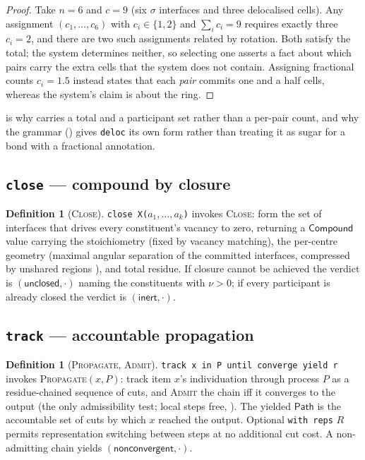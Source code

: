\documentclass[11pt,twocolumn,a4paper]{article}
\theoremstyle{thmstyle}
\theoremstyle{definition}
\newtheorem{definition}[theorem]{Definition}
\theoremstyle{remark}
\newcommand{\hj}[1]{\texttt{#1}}
\begin{document}
\begin{proof}
Take $n=6$ and $c=9$ (six $\sigma$ interfaces and three delocalised
cells). Any assignment $(c_1,\dots,c_6)$ with $c_i\in\{1,2\}$ and
$\sum_i c_i=9$ requires exactly three $c_i=2$, and there are two such
assignments related by rotation. Both satisfy the total; the system
determines neither, so selecting one asserts a fact about which pairs
carry the extra cells that the system does not contain. Assigning
fractional counts $c_i=1.5$ instead states that each \emph{pair}
commits one and a half cells, whereas the system's claim is about the
ring.
\end{proof}

 is why  carries a total and a
participant set rather than a per-pair count, and why the grammar
() gives \hj{deloc} its own form rather than treating it
as sugar for a bond with a fractional annotation.

\subsection{\texorpdfstring{\hj{close} --- compound by closure}{close --- compound by closure}}
\label{sec:stdlib-compound}

\begin{definition}[\textsc{Close}]
\label{def:close}
\hj{close X($a_1,\dots,a_k$)} invokes \textsc{Close}: form the set of
interfaces that drives every constituent's vacancy to zero, returning a
$\mathsf{Compound}$ value carrying the stoichiometry (fixed by vacancy
matching), the per-centre geometry (maximal angular separation of the
committed interfaces, compressed by unshared regions
\citep{gillespie1957}), and total residue. If closure cannot be achieved
the verdict is $(\textsf{unclosed},\cdot)$ naming the constituents with
$\nu>0$; if every participant is already closed the verdict is
$(\textsf{inert},\cdot)$.
\end{definition}

\subsection{\texorpdfstring{\hj{track} --- accountable propagation}{track --- accountable propagation}}
\label{sec:stdlib-track}

\begin{definition}[\textsc{Propagate}, \textsc{Admit}]
\label{def:propagate}
\hj{track x in P until converge yield r} invokes
\textsc{Propagate}$(x,P)$: track item $x$'s individuation through process
$P$ as a residue-chained sequence of cuts, and \textsc{Admit} the chain
iff it converges to the output (the only admissibility test; local steps
free, ). The yielded $\mathsf{Path}$ is the
accountable set of cuts by which $x$ reached the output. Optional
\hj{with reps} $R$ permits representation switching between steps at no
additional cut cost. A non-admitting chain yields
$(\textsf{nonconvergent},\cdot)$.
\end{definition}
\end{document}
